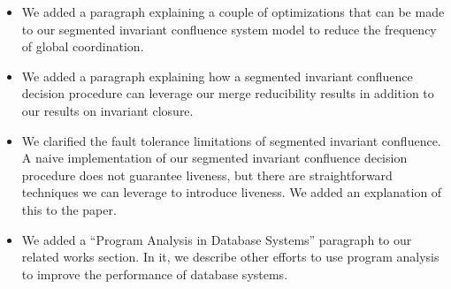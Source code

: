 \documentclass[12pt]{article}
\begin{document}
\begin{itemize}
  \item
    We added a paragraph explaining a couple of optimizations that can be made
    to our segmented invariant confluence system model to reduce the frequency
    of global coordination.

  \item
    We added a paragraph explaining how a segmented invariant confluence
    decision procedure can leverage our merge reducibility results in addition
    to our results on invariant closure.

  \item
    We clarified the fault tolerance limitations of segmented invariant
    confluence. A naive implementation of our segmented invariant confluence
    decision procedure does not guarantee liveness, but there are
    straightforward techniques we can leverage to introduce liveness. We added
    an explanation of this to the paper.

  \item
    We added a ``Program Analysis in Database Systems'' paragraph to our
    related works section. In it, we describe other efforts to use program
    analysis to improve the performance of database systems.
\end{itemize}



\end{document}
